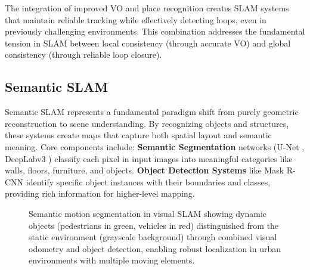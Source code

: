 \documentclass[12pt]{article}
\begin{document}
    The integration of improved VO and place recognition creates SLAM systems that maintain reliable tracking while effectively detecting loops, even in previously challenging environments. 
    This combination addresses the fundamental tension in SLAM between local consistency (through accurate VO) and global consistency (through reliable loop closure).
    
    \subsection{Semantic SLAM}
    Semantic SLAM represents a fundamental paradigm shift from purely geometric reconstruction to scene understanding. By recognizing objects and structures, these systems create maps that capture both spatial layout and semantic meaning.
    Core components include:
    \textbf{Semantic Segmentation} networks (U-Net \cite{u-netformer}, DeepLabv3 \cite{deeplabv3}) classify each pixel in input images into meaningful categories like walls, floors, furniture, and objects.
    \textbf{Object Detection Systems} like Mask R-CNN \cite{mask_r-cnn} identify specific object instances with their boundaries and classes, providing rich information for higher-level mapping.

    \begin{figure}[h!]
        \vspace{0.5cm}
        \centering
        \caption{Semantic motion segmentation in visual SLAM showing dynamic objects (pedestrians in green, vehicles in red) distinguished from the static environment (grayscale background) through combined visual odometry and object detection, 
        enabling robust localization in urban environments with multiple moving elements. \cite{geiger_lib}}
        \label{fig:visual_odometry}
    \end{figure}
\end{document}

